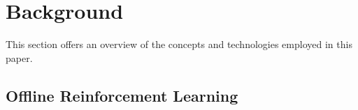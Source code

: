 \vspace{-0.2cm}
\section{Background}\label{ch4:sec:Background}
This section offers an overview of the concepts and technologies employed in this paper.
\subsection{Offline Reinforcement Learning}


